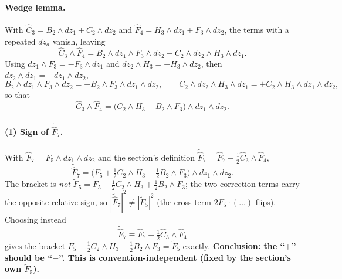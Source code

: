 \paragraph{Wedge lemma.}
With $\hat C_3 = B_2\wedge dz_1 + C_2\wedge dz_2$ and $\hat F_4 = H_3\wedge dz_1 + F_3\wedge dz_2$, the
terms with a repeated $dz_a$ vanish, leaving
\begin{equation}
\hat C_3\wedge\hat F_4
= B_2\wedge dz_1\wedge F_3\wedge dz_2 + C_2\wedge dz_2\wedge H_3\wedge dz_1 .
\end{equation}
Using $dz_1\wedge F_3 = -F_3\wedge dz_1$ and $dz_2\wedge H_3 = -H_3\wedge dz_2$, then $dz_2\wedge dz_1=-dz_1\wedge dz_2$,
\begin{equation}
B_2\wedge dz_1\wedge F_3\wedge dz_2 = - B_2\wedge F_3\wedge dz_1\wedge dz_2,
\qquad
C_2\wedge dz_2\wedge H_3\wedge dz_1 = + C_2\wedge H_3\wedge dz_1\wedge dz_2,
\end{equation}
so that
\begin{equation}
\boxed{\;\hat C_3\wedge\hat F_4 = \big(C_2\wedge H_3 - B_2\wedge F_3\big)\wedge dz_1\wedge dz_2 .\;}
\label{scratch-wedge}
\end{equation}

\paragraph{(1) Sign of $\tilde{\hat F}_7$.}
With $\hat F_7 = F_5\wedge dz_1\wedge dz_2$ and the section's definition $\tilde{\hat F}_7 = \hat F_7 + \tfrac12\hat C_3\wedge\hat F_4$,
\begin{equation}
\tilde{\hat F}_7
= \Big(F_5 + \tfrac12 C_2\wedge H_3 - \tfrac12 B_2\wedge F_3\Big)\wedge dz_1\wedge dz_2 .
\end{equation}
The bracket is \emph{not} $\tilde F_5 = F_5 - \tfrac12 C_2\wedge H_3 + \tfrac12 B_2\wedge F_3$; the two correction
terms carry the opposite relative sign, so $|\tilde{\hat F}_7|^2 \ne |\tilde F_5|^2$ (the cross term $2F_5\!\cdot\!(\dots)$ flips).
Choosing instead
\begin{equation}
\boxed{\;\tilde{\hat F}_7 \equiv \hat F_7 - \tfrac12\hat C_3\wedge\hat F_4\;}
\end{equation}
gives the bracket $F_5 - \tfrac12 C_2\wedge H_3 + \tfrac12 B_2\wedge F_3 = \tilde F_5$ exactly.
\textbf{Conclusion: the ``$+$'' should be ``$-$''. This is convention-independent (fixed by the section's own $\tilde F_5$).}

